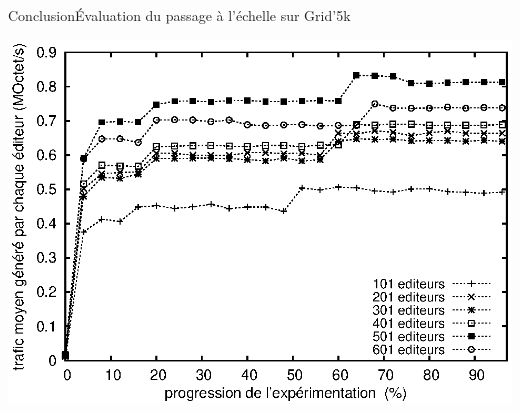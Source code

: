 \begin{frame}{Conclusion}{Évaluation du passage à l'échelle sur Grid'5k}

  \begin{center}
    \includegraphics[width=1\textwidth]{img/editor/communication.eps}
  \end{center}

\end{frame}


